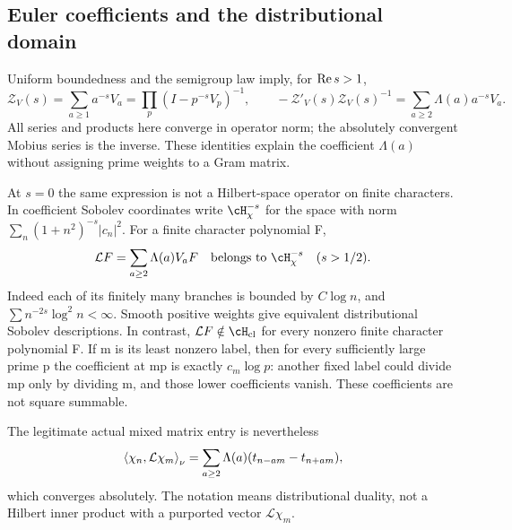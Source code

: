 \subsection{Euler coefficients and the distributional domain}
Uniform boundedness and the semigroup law imply, for $\operatorname{Re} s>1$,
\begin{equation}
\mathcal Z_V(s)=\sum_{a\ge1}a^{-s}V_a
=\prod_p(I-p^{-s}V_p)^{-1},\qquad
-\mathcal Z'_V(s)\mathcal Z_V(s)^{-1}
=\sum_{a\ge2}\Lambda(a)a^{-s}V_a.
\end{equation}
All series and products here converge in operator norm; the
absolutely convergent Mobius series is the inverse. These identities
explain the coefficient $\Lambda(a)$ without assigning prime
weights to a Gram matrix.

At $s=0$ the same expression is not a Hilbert-space operator on
finite characters. In coefficient Sobolev coordinates write
$\cH^{-s}_{\chi}$ for the space with norm
$\sum_n(1+n^2)^{-s}|c_n|^2$. For a finite character polynomial F,
\begin{equation}\label{eq:L-domain}
\mathcal L F=\sum_{a\ge2}\Lambda(a)V_aF
\quad\hbox{belongs to }\cH^{-s}_{\chi}\quad(s>1/2).
\end{equation}
Indeed each of its finitely many branches is bounded by
$C\log n$, and $\sum n^{-2s}\log^2n<\infty$.
Smooth positive weights give equivalent distributional Sobolev
descriptions. In contrast, $\mathcal LF\notin\cH_{\rm cl}$ for
every nonzero finite character polynomial F. If m is its least
nonzero label, then for every sufficiently large prime p the
coefficient at mp is exactly $c_m\log p$: another fixed label
could divide mp only by dividing m, and those lower coefficients
vanish. These coefficients are not square summable.

The legitimate actual mixed matrix entry is nevertheless
\begin{equation}\label{eq:prime-distribution}
\left\langle\chi_n,\mathcal L\chi_m\right\rangle_\nu
=\sum_{a\ge2}\Lambda(a)(t_{n-am}-t_{n+am}),
\end{equation}
which converges absolutely. The notation means distributional
duality, not a Hilbert inner product with a purported vector
$\mathcal L\chi_m$.

